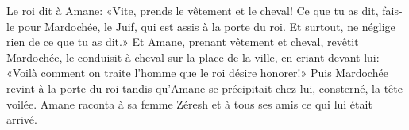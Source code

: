 Le roi dit à Amane: «Vite, prends le vêtement et le cheval!
	Ce que tu as dit, fais-le pour Mardochée, le Juif, qui est assis à la porte du roi.
	Et surtout, ne néglige rien de ce que tu as dit.»
Et Amane, prenant vêtement et cheval,
	revêtit Mardochée, le conduisit à cheval sur la place de la ville,
	en criant devant lui: «Voilà comment on traite l’homme que le roi désire honorer!»
Puis Mardochée revint à la porte du roi
	tandis qu’Amane se précipitait chez lui, consterné, la tête voilée.
Amane raconta à sa femme Zéresh et à tous ses amis ce qui lui était arrivé.

